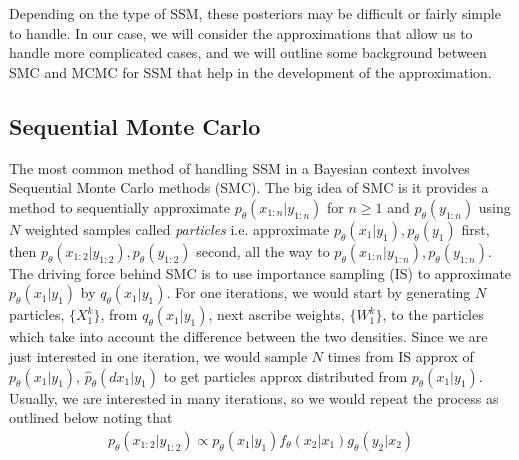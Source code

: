 \documentclass{article}\usepackage[]{graphicx}\usepackage[]{color}
\theoremstyle{definition}
\begin{document}
Depending on the type of SSM, these posteriors may be difficult or fairly simple to handle. In our case, we will consider the approximations that allow us to handle more complicated cases, and we will outline some background between SMC and MCMC for SSM that help in the development of the approximation.



\subsection{Sequential Monte Carlo}

The most common method of handling SSM in a Bayesian context involves Sequential Monte Carlo methods (SMC). The big idea of SMC is it provides a method to sequentially approximate $p_\theta(x_{1:n}|y_{1:n})$ for $n \geq 1$ and $p_\theta(y_{1:n})$ using $N$ weighted samples called \textit{particles} i.e. approximate $p_\theta(x_1 | y_1), p_\theta(y_1)$ first, then $p_\theta(x_{1:2} | y_{1:2}), p_\theta(y_{1:2})$ second, all the way to $p_\theta(x_{1:n} | y_{1:n}), p_\theta(y_{1:n})$. \\

The driving force behind SMC is to use importance sampling (IS) to approximate $p_\theta(x_1 | y_1)$ by $q_\theta(x_1 | y_1)$. For one iterations, we would start by generating $N$ particles, $\{ X^k_1 \}$, from $q_\theta(x_1 | y_1)$, next ascribe weights, $\{ W^k_1 \}$, to the particles which take into account the difference between the two densities. Since we are just interested in one iteration, we would sample $N$ times from IS approx of $p_\theta(x_1 | y_1)$, $\hat{p}_\theta(dx_1 | y_1)$ to get particles approx distributed from $p_\theta(x_1 | y_1)$. Usually, we are interested in many iterations, so we would repeat the process as outlined below noting that
\begin{align*}
  p_\theta(x_{1:2} | y_{1:2}) \propto p_\theta(x_1|y_1) f_\theta(x_2|x_1) g_\theta(y_2|x_2)
\end{align*}\\
\end{document}

